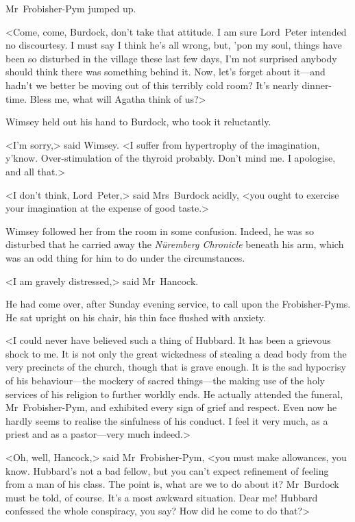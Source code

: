 Mr~Frobisher-Pym jumped up.

<Come, come, Burdock, don't take that attitude. I am sure Lord~Peter intended no discourtesy. I must say I think he's all wrong, but, 'pon my soul, things have been so disturbed in the village these last few days, I'm not surprised anybody should think there was something behind it. Now, let's forget about it—and hadn't we better be moving out of this terribly cold room? It's nearly dinner-time. Bless me, what will Agatha think of us?>

Wimsey held out his hand to Burdock, who took it reluctantly.

<I'm sorry,> said Wimsey. <I suffer from hypertrophy of the imagination, y'know. Over-stimulation of the thyroid probably. Don't mind me. I apologise, and all that.>

<I don't think, Lord~Peter,> said Mrs~Burdock acidly, <you ought to exercise your imagination at the expense of good taste.>

Wimsey followed her from the room in some confusion. Indeed, he was so disturbed that he carried away the \textit{Nüremberg Chronicle} beneath his arm, which was an odd thing for him to do under the circumstances.

\divider
<I am gravely distressed,> said Mr~Hancock.

He had come over, after Sunday evening service, to call upon the Frobisher-Pyms. He sat upright on his chair, his thin face flushed with anxiety.

<I could never have believed such a thing of Hubbard. It has been a grievous shock to me. It is not only the great wickedness of stealing a dead body from the very precincts of the church, though that is grave enough. It is the sad hypocrisy of his behaviour—the mockery of sacred things—the making use of the holy services of his religion to further worldly ends. He actually attended the funeral, Mr~Frobisher-Pym, and exhibited every sign of grief and respect. Even now he hardly seems to realise the sinfulness of his conduct. I feel it very much, as a priest and as a pastor—very much indeed.>

<Oh, well, Hancock,> said Mr~Frobisher-Pym, <you must make allowances, you know. Hubbard's not a bad fellow, but you can't expect refinement of feeling from a man of his class. The point is, what are we to do about it? Mr~Burdock must be told, of course. It's a most awkward situation. Dear me! Hubbard confessed the whole conspiracy, you say? How did he come to do that?>

